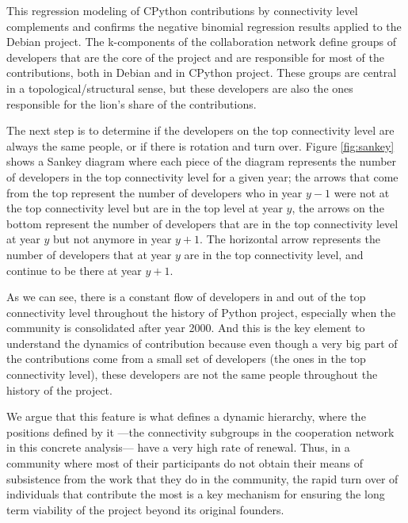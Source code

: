 

This regression modeling of CPython contributions by connectivity level complements and confirms the negative binomial regression results applied to the Debian project. The k-components of the collaboration network define groups of developers that are the core of the project and are responsible for most of the contributions, both in Debian and in CPython project. These groups are central in a topological/structural sense, but these developers are also the ones responsible for the lion's share of the contributions.

The next step is to determine if the developers on the top connectivity level are always the same people, or if there is rotation and turn over. Figure \ref{fig:sankey} shows a Sankey diagram where each piece of the diagram represents the number of developers in the top connectivity level for a given year; the arrows that come from the top represent the number of developers who in year $y - 1$ were not at the top connectivity level but are in the top level at year $y$, the arrows on the bottom represent the number of developers that are in the top connectivity level at year $y$ but not anymore in year $y + 1$. The horizontal arrow represents the number of developers that at year $y$ are in the top connectivity level, and continue to be there at year $y + 1$.

As we can see, there is a constant flow of developers in and out of the top connectivity level throughout the history of Python project, especially when the community is consolidated after year 2000. And this is the key element to understand the dynamics of contribution because even though a very big part of the contributions come from a small set of developers (the ones in the top connectivity level), these developers are not the same people throughout the history of the project.

We argue that this feature is what defines a dynamic hierarchy, where the positions defined by it ---the connectivity subgroups in the cooperation network in this concrete analysis--- have a very high rate of renewal. Thus, in a community where most of their participants do not obtain their means of subsistence from the work that they do in the community, the rapid turn over of individuals that contribute the most is a key mechanism for ensuring the long term viability of the project beyond its original founders.

